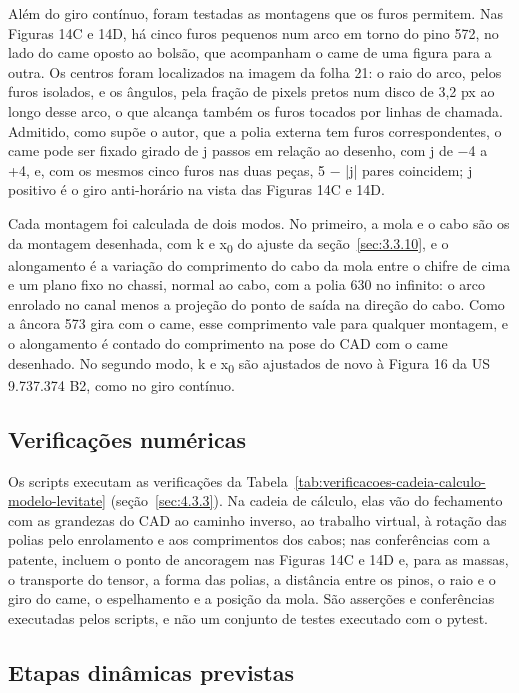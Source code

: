Além do giro contínuo, foram testadas as montagens que os furos permitem. Nas Figuras 14C e 14D, há cinco furos pequenos num arco em torno do pino 572, no lado do came oposto ao bolsão, que acompanham o came de uma figura para a outra. Os centros foram localizados na imagem da folha 21: o raio do arco, pelos furos isolados, e os ângulos, pela fração de pixels pretos num disco de 3,2 px ao longo desse arco, o que alcança também os furos tocados por linhas de chamada. Admitido, como supõe o autor, que a polia externa tem furos correspondentes, o came pode ser fixado girado de j passos em relação ao desenho, com j de −4 a +4, e, com os mesmos cinco furos nas duas peças, 5 − |j| pares coincidem; j positivo é o giro anti-horário na vista das Figuras 14C e 14D.

Cada montagem foi calculada de dois modos. No primeiro, a mola e o cabo são os da montagem desenhada, com k e x\textsubscript{0} do ajuste da seção~\ref{sec:3.3.10}, e o alongamento é a variação do comprimento do cabo da mola entre o chifre de cima e um plano fixo no chassi, normal ao cabo, com a polia 630 no infinito: o arco enrolado no canal menos a projeção do ponto de saída na direção do cabo. Como a âncora 573 gira com o came, esse comprimento vale para qualquer montagem, e o alongamento é contado do comprimento na pose do CAD com o came desenhado. No segundo modo, k e x\textsubscript{0} são ajustados de novo à Figura 16 da US 9.737.374 B2, como no giro contínuo.

\subsection{Verificações numéricas}\label{sec:3.3.12}

Os scripts executam as verificações da Tabela~\ref{tab:verificacoes-cadeia-calculo-modelo-levitate} (seção~\ref{sec:4.3.3}). Na cadeia de cálculo, elas vão do fechamento com as grandezas do CAD ao caminho inverso, ao trabalho virtual, à rotação das polias pelo enrolamento e aos comprimentos dos cabos; nas conferências com a patente, incluem o ponto de ancoragem nas Figuras 14C e 14D e, para as massas, o transporte do tensor, a forma das polias, a distância entre os pinos, o raio e o giro do came, o espelhamento e a posição da mola. São asserções e conferências executadas pelos scripts, e não um conjunto de testes executado com o pytest.

\subsection{Etapas dinâmicas previstas}\label{sec:3.3.13}

